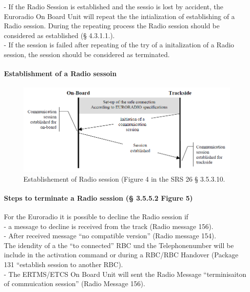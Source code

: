 \documentclass{template/openetcs_report}
\begin{document}
- If the Radio Session is established and the sessio is lost by accident, the Euroradio On Board Unit will repeat the the intialization of establishing of a Radio session. During the repeating process the Radio session should be considered as established (§ 4.3.1.1.).\\

-  If the session is failed after repeating of the try of a initalization of a Radio session, the session should be considered as terminated.\\

\paragraph{Establishment of a Radio sessoin}
\begin{figure}[hbtp]
\centering
\includegraphics [scale=0.5]{images/EstablishmentofRadioSession}
\caption{Establishement of Radio session (Figure 4 in the SRS 26 § 3.5.3.10.}
\end{figure}
\newpage

\paragraph{Steps to terminate a Radio session (§ 3.5.5.2 Figure 5)}
For the Euroradio it is possible to decline the Radio session if\\

- a message to decline is received from the track (Radio message 156).\\

- After received message ``no compatible version'' (Radio message 154).\\

The idendity of a the ``to connected'' RBC und the Telephonenumber will be include in the activation command or during a RBC/RBC Handover (Package 131 ``establish session to another RBC).\\

- The ERTMS/ETCS On Board Unit will sent the Radio Message ``terminisaiton of commuication session'' (Radio Message 156).\\
\end{document}

